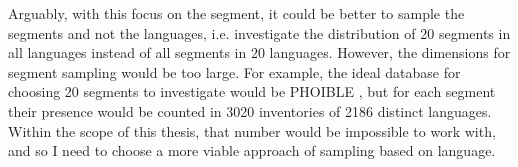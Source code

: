 \par
Arguably, with this focus on the segment, it could be better to sample the segments and not the languages, i.e. investigate the distribution of 20 segments in all languages instead of all segments in 20 languages. However, the dimensions for segment sampling would be too large. For example, the ideal database for choosing 20 segments to investigate would be PHOIBLE \citep{phoible}, but for each segment their presence would be counted in 3020 inventories of 2186 distinct languages. Within the scope of this thesis, that number would be impossible to work with, and so I need to choose a more viable approach of sampling based on language.  